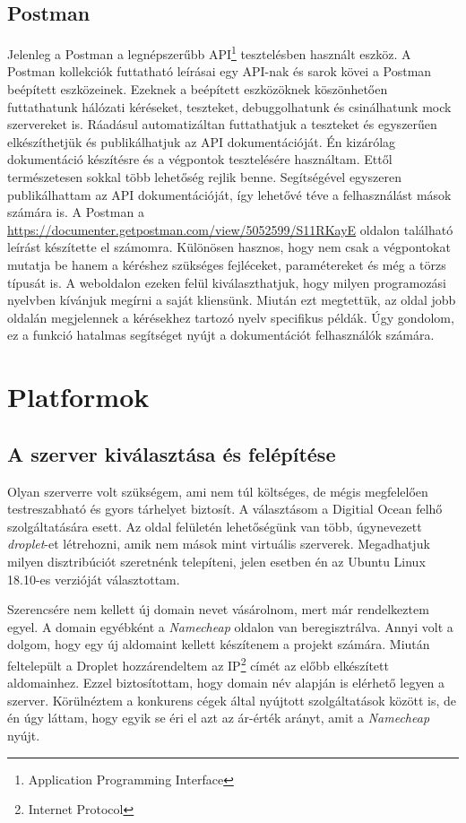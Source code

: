 \documentclass{thesis-ekf}
\theoremstyle{definition}
\theoremstyle{remark}
\begin{document}
\section{Postman}

Jelenleg a Postman a legnépszerűbb API\footnote{Application Programming Interface} tesztelésben használt eszköz.
A Postman kollekciók futtatható leírásai egy API-nak és sarok kövei a Postman beépített eszközeinek.
Ezeknek a beépített eszközöknek köszönhetően futtathatunk hálózati kéréseket, teszteket, debuggolhatunk és csinálhatunk mock szervereket is.
Ráadásul automatizáltan futtathatjuk a teszteket és egyszerűen elkészíthetjük és publikálhatjuk az API dokumentációját.
Én kizárólag dokumentáció készítésre és a végpontok tesztelésére használtam. Ettől természetesen sokkal több lehetőség rejlik benne.
Segítségével egyszeren publikálhattam az API dokumentációját, így lehetővé téve a felhasználást mások számára is.
A Postman a \url{https://documenter.getpostman.com/view/5052599/S11RKayE} oldalon található leírást készítette el számomra.
Különösen hasznos, hogy nem csak a végpontokat mutatja be hanem a kéréshez szükséges fejléceket, paramétereket és még a törzs típusát is.
A weboldalon ezeken felül kiválaszthatjuk, hogy milyen programozási nyelvben kívánjuk megírni a saját kliensünk.
Miután ezt megtettük, az oldal jobb oldalán megjelennek a kérésekhez tartozó nyelv specifikus példák.
Úgy gondolom, ez a funkció hatalmas segítséget nyújt a dokumentációt felhasználók számára.

\chapter{Platformok}\label{platformok}

\section{A szerver kiválasztása és felépítése}

Olyan szerverre volt szükségem, ami nem túl költséges, de mégis megfelelően testreszabható és gyors tárhelyet biztosít.
A választásom a Digitial Ocean felhő szolgáltatására esett. Az oldal felületén lehetőségünk van több, úgynevezett \emph{droplet}-et létrehozni, amik nem mások mint virtuális szerverek. 
Megadhatjuk milyen disztribúciót szeretnénk telepíteni, jelen esetben én az Ubuntu Linux 18.10-es verzióját választottam.

Szerencsére nem kellett új domain nevet vásárolnom, mert már rendelkeztem egyel.
A domain egyébként a \emph{Namecheap} oldalon van beregisztrálva.
Annyi volt a dolgom, hogy egy új aldomaint kellett készítenem a projekt számára.
Miután feltelepült a Droplet hozzárendeltem az IP\footnote{Internet Protocol} címét az előbb elkészített aldomainhez.
Ezzel biztosítottam, hogy domain név alapján is elérhető legyen a szerver.
Körülnéztem a konkurens cégek által nyújtott szolgáltatások között is, de én úgy láttam, hogy egyik se éri el azt az ár-érték arányt, amit a \emph{Namecheap} nyújt. 
\end{document}
